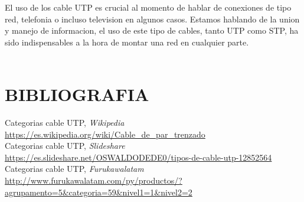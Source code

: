 \documentclass[onecolumn,12pt]{IEEEtran}
\begin{document}
El uso de los cable UTP es crucial al momento de hablar de conexiones de tipo red, telefonia o incluso television en algunos casos. Estamos hablando de la union y manejo de informacion, el uso de este tipo de cables, tanto UTP como STP, ha sido indispensables a la hora de montar una red en cualquier parte.
\hfill \\
\hfill \\
\section{BIBLIOGRAFIA}

Categorias cable UTP,
\emph{Wikipedia} \\
\url{https://es.wikipedia.org/wiki/Cable\_de\_par\_trenzado} \\

Categorias cable UTP,
\emph{Slideshare} \\
\url{https://es.slideshare.net/OSWALDODEDE0/tipos-de-cable-utp-12852564} \\

Categorias cable UTP,
\emph{Furukawalatam} \\
\url{http://www.furukawalatam.com/py/productos/?agrupamento=5&categoria=59&nivel1=1&nivel2=2}
\end{document}
